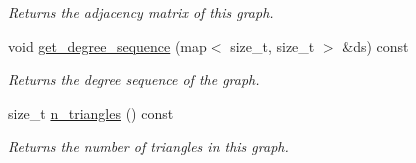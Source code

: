 \begin{DoxyCompactItemize}
\begin{DoxyCompactList}\small\item\em Returns the adjacency matrix of this graph. \end{DoxyCompactList}\item 
void \hyperlink{classlgraph_1_1utils_1_1xxgraph_aff73f5ac4cd2732caa0c528eb1c1833c}{get\+\_\+degree\+\_\+sequence} (map$<$ size\+\_\+t, size\+\_\+t $>$ \&ds) const 
\begin{DoxyCompactList}\small\item\em Returns the degree sequence of the graph. \end{DoxyCompactList}\item 
size\+\_\+t \hyperlink{classlgraph_1_1utils_1_1xxgraph_ad4f25a8b29c6f26bc1567cb9c5a564ba}{n\+\_\+triangles} () const 
\begin{DoxyCompactList}\small\item\em Returns the number of triangles in this graph. \end{DoxyCompactList}\end{DoxyCompactItemize}
